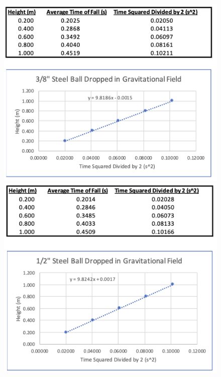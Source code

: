\begin{figure}[!h]
    \centering
    \includegraphics[scale=0.55]{resources/GraphSmall.png}
    \includegraphics[scale=0.55]{resources/GraphLarge.png}
\end{figure}

\newpage
